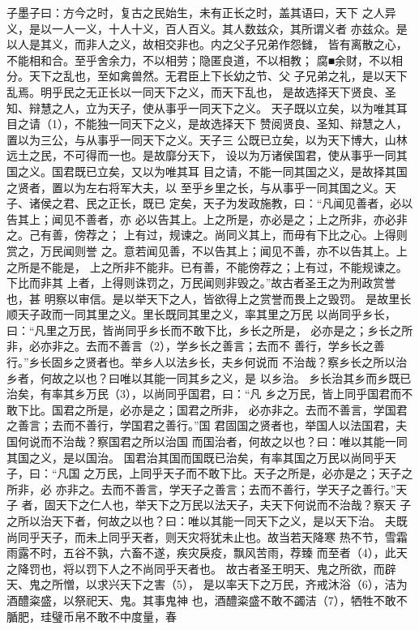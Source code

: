 \documentclass[12pt,UTF8]{ctexbook}
\begin{document}
子墨子曰：方今之时，复古之民始生，未有正长之时，盖其语曰，天下 
之人异义，是以一人一义，十人十义，百人百义。其人数兹众，其所谓义者 
亦兹众。是以人是其义，而非人之义，故相交非也。内之父子兄弟作怨雠， 
皆有离散之心，不能相和合。至乎舍余力，不以相劳；隐匿良道，不以相教； 
腐■余财，不以相分。天下之乱也，至如禽兽然。无君臣上下长幼之节、父 
子兄弟之礼，是以天下乱焉。明乎民之无正长以一同天下之义，而天下乱也， 
是故选择天下贤良、圣知、辩慧之人，立为天子，使从事乎一同天下之义。 
天子既以立矣，以为唯其耳目之请（1），不能独一同天下之义，是故选择天下 
赞阅贤良、圣知、辩慧之人，置以为三公，与从事乎一同天下之义。天子三 
公既已立矣，以为天下博大，山林远土之民，不可得而一也。是故靡分天下， 
设以为万诸侯国君，使从事乎一同其国之义。国君既已立矣，又以为唯其耳 
目之请，不能一同其国之义，是故择其国之贤者，置以为左右将军大夫，以 
至乎乡里之长，与从事乎一同其国之义。天子、诸侯之君、民之正长，既已 
定矣，天子为发政施教，曰：“凡闻见善者，必以告其上；闻见不善者，亦 
必以告其上。上之所是，亦必是之；上之所非，亦必非之。己有善，傍荐之； 
上有过，规谏之。尚同义其上，而毋有下比之心。上得则赏之，万民闻则誉 
之。意若闻见善，不以告其上；闻见不善，亦不以告其上。上之所是不能是， 
上之所非不能非。已有善，不能傍荐之；上有过，不能规谏之。下比而非其 
上者，上得则诛罚之，万民闻则非毁之。”故古者圣王之为刑政赏誉也，甚 
明察以审信。是以举天下之人，皆欲得上之赏誉而畏上之毁罚。 
是故里长顺天子政而一同其里之义。里长既同其里之义，率其里之万民 
以尚同乎乡长，曰：“凡里之万民，皆尚同乎乡长而不敢下比，乡长之所是， 
必亦是之；乡长之所非，必亦非之。去而不善言（2），学乡长之善言；去而不 
善行，学乡长之善行。”乡长固乡之贤者也。举乡人以法乡长，夫乡何说而 
不治哉？察乡长之所以治乡者，何故之以也？曰唯以其能一同其乡之义，是 
以乡治。 
乡长治其乡而乡既已治矣，有率其乡万民（3），以尚同乎国君，曰：“凡 
乡之万民，皆上同乎国君而不敢下比。国君之所是，必亦是之；国君之所非， 
必亦非之。去而不善言，学国君之善言；去而不善行，学国君之善行。”国 
君固国之贤者也，举国人以法国君，夫国何说而不治哉？察国君之所以治国 
而国治者，何故之以也？曰：唯以其能一同其国之义，是以国治。 
国君治其国而国既已治矣，有率其国之万民以尚同乎天子，曰：“凡国 
之万民，上同乎天子而不敢下比。天子之所是，必亦是之；天子之所非，必 
亦非之。去而不善言，学天子之善言；去而不善行，学天子之善行。”天子 
者，固天下之仁人也，举天下之万民以法天子，夫天下何说而不治哉？察天 
子之所以治天下者，何故之以也？曰：唯以其能一同天下之义，是以天下治。 
夫既尚同乎天子，而未上同乎天者，则天灾将犹未止也。故当若天降寒 
热不节，雪霜雨露不时，五谷不孰，六畜不遂，疾灾戾疫，飘风苦雨，荐臻 
而至者（4），此天之降罚也，将以罚下人之不尚同乎天者也。 
故古者圣王明天、鬼之所欲，而辟天、鬼之所憎，以求兴天下之害（5）， 
是以率天下之万民，齐戒沐浴（6），洁为酒醴粢盛，以祭祀天、鬼。其事鬼神 
也，酒醴粢盛不敢不蠲洁（7），牺牲不敢不腯肥，珪璧币帛不敢不中度量，春 
\end{document}
